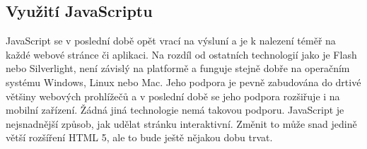 \subsection{Využití JavaScriptu}

JavaScript se v poslední době opět vrací na výsluní a je k nalezení téměř na každé webové stránce či aplikaci. Na rozdíl od ostatních technologií jako je Flash\cite{flash} nebo Silverlight\cite{silverlight}, není závislý na platformě a funguje stejně dobře na operačním systému Windows, Linux nebo Mac. Jeho podpora je pevně zabudována do drtivé většiny webových prohlížečů a v poslední době se jeho podpora rozšiřuje i na mobilní zařízení. Žádná jiná technologie nemá takovou podporu. JavaScript je nejsnadnější způsob, jak udělat stránku interaktivní. Změnit to může snad jedině větší rozšíření HTML 5, ale to bude ještě nějakou dobu trvat.